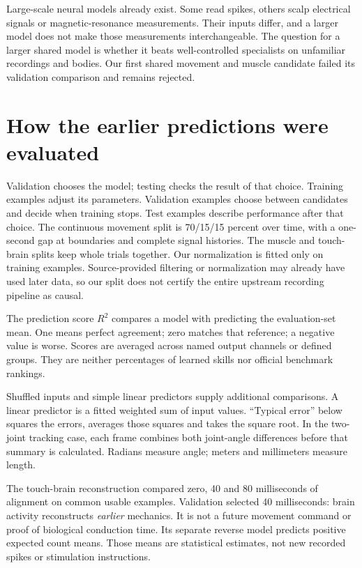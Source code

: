 Large-scale neural models already exist. Some read spikes, others scalp
electrical signals or magnetic-resonance measurements. Their inputs differ,
and a larger model does not make those measurements interchangeable.
\citep{ndt2_2023,poyo2023,brainlm2023,neurogpt2024}
The question for a larger shared model is whether it beats well-controlled
specialists on unfamiliar recordings and bodies. Our first shared movement
and muscle candidate failed its validation comparison and remains rejected.

\section{How the earlier predictions were evaluated}

Validation chooses the model; testing checks the result of that choice. Training examples adjust its parameters. Validation examples choose between candidates and decide when training stops. Test examples describe performance after that choice. The continuous movement split is 70/15/15 percent over time,
with a one-second gap at boundaries and complete signal histories. The muscle
and touch-brain splits keep whole trials together. Our normalization is fitted
only on training examples. Source-provided filtering or normalization may
already have used later data, so our split does not certify the entire upstream
recording pipeline as causal.

The prediction score $R^2$ compares a model with predicting the evaluation-set mean. One means perfect agreement; zero matches that reference; a negative value is worse. Scores are averaged across named output channels or defined groups. They are neither percentages of learned skills nor official benchmark rankings.

Shuffled inputs and simple linear predictors supply additional comparisons. A linear predictor is a fitted weighted sum of input values. ``Typical error'' below squares the errors, averages those squares and takes the square root. In the two-joint tracking case, each frame combines both joint-angle differences before that summary is calculated. Radians measure angle; meters and millimeters measure length.

The touch-brain reconstruction compared zero, 40 and 80 milliseconds of
alignment on common usable examples. Validation selected 40 milliseconds:
brain activity reconstructs \emph{earlier} mechanics. It is not a future movement
command or proof of biological conduction time. Its separate reverse model
predicts positive expected count means. Those means are statistical estimates,
not new recorded spikes or stimulation instructions.


